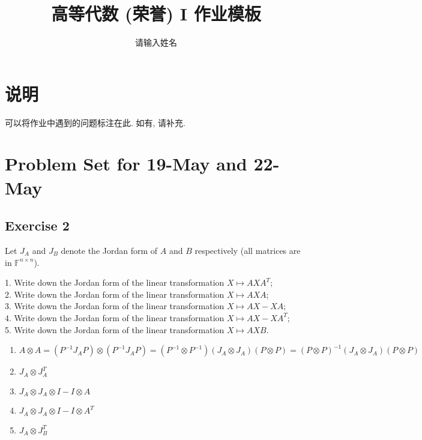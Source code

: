 \documentclass[11pt]{ctexart}
\title{高等代数 (荣誉) I 作业模板}
\author{请输入姓名}
\theoremstyle{definition}
\numberwithin{equation}{section}
\theoremstyle{definition}
\theoremstyle{remark}
\begin{document}
\maketitle

\section{说明}

可以将作业中遇到的问题标注在此. 如有, 请补充.

\tableofcontents

\newpage


\section{Problem Set for 19-May and 22-May}
\subsection{Exercise 2}
Let $J_A$ and $J_B$ denote the Jordan form of $A$ and $B$ respectively (all matrices are in $\mathbb F^{n \times n}$).

1. Write down the Jordan form of the linear transformation $X \mapsto AXA^T$;\\
2. Write down the Jordan form of the linear transformation $X \mapsto AXA$;\\
3. Write down the Jordan form of the linear transformation $X \mapsto AX - XA$; \\
4. Write down the Jordan form of the linear transformation $X \mapsto AX - XA^T$;\\
5. Write down the Jordan form of the linear transformation $X \mapsto AXB$.
\begin{aaa}
    \begin{enumerate}
        \item $A\otimes A=(P^{-1}J_AP)\otimes(P^{-1}J_AP)=(P^{-1}\otimes P^{-1})(J_A\otimes J_A)(P\otimes P)=(P\otimes P)^{-1}(J_A\otimes J_A)(P\otimes P)$\\
        \item $J_A\otimes J_A^T$
        \item $J_A\otimes J_A\otimes I-I\otimes A$
        \item $J_A\otimes J_A\otimes I-I\otimes A^T$
        \item $J_A\otimes J_B^T$
    \end{enumerate}
\end{aaa}
\end{document}
